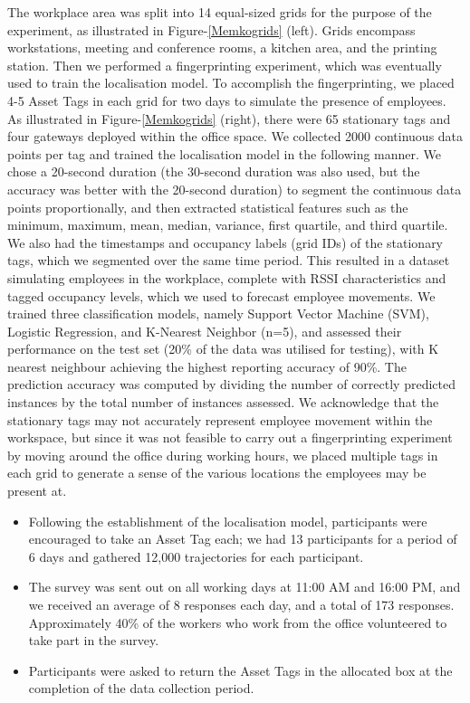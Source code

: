 \documentclass[acmtog]{acmart}
\begin{document}
The workplace area was split into 14 equal-sized grids for the purpose of the experiment, as illustrated in Figure-\ref{Memkogrids} (left). Grids encompass workstations, meeting and conference rooms, a kitchen area, and the printing station. Then we performed a fingerprinting experiment, which was eventually used to train the localisation model. To accomplish the fingerprinting, we placed 4-5 Asset Tags in each grid for two days to simulate the presence of employees. As illustrated in Figure-\ref{Memkogrids} (right), there were 65 stationary tags and four gateways deployed within the office space. We collected 2000 continuous data points per tag and trained the localisation model in the following manner. We chose a 20-second duration (the 30-second duration was also used, but the accuracy was better with the 20-second duration) to segment the continuous data points proportionally, and then extracted statistical features such as the minimum, maximum, mean, median, variance, first quartile, and third quartile. We also had the timestamps and occupancy labels (grid IDs) of the stationary tags, which we segmented over the same time period. This resulted in a dataset simulating employees in the workplace, complete with RSSI characteristics and tagged occupancy levels, which we used to forecast employee movements. We trained three classification models, namely Support Vector Machine (SVM), Logistic Regression, and K-Nearest Neighbor (n=5), and assessed their performance on the test set (20\% of the data was utilised for testing), with K nearest neighbour achieving the highest reporting accuracy of 90\%. The prediction accuracy was computed by dividing the number of correctly predicted instances by the total number of instances assessed. We acknowledge that the stationary tags may not accurately represent employee movement within the workspace, but since it was not feasible to carry out a fingerprinting experiment by moving around the office during working hours, we placed multiple tags in each grid to generate a sense of the various locations the employees may be present at.
\begin{itemize}
    \item Following the establishment of the localisation model, participants were encouraged to take an Asset Tag each; we had 13 participants for a period of 6 days and gathered 12,000 trajectories for each participant.
    \item The survey was sent out on all working days at 11:00 AM and 16:00 PM, and we received an average of 8 responses each day, and a total of 173 responses. Approximately 40\% of the workers who work from the office volunteered to take part in the survey.
    \item Participants were asked to return the Asset Tags in the allocated box at the completion of the data collection period.
\end{itemize}
\end{document}
